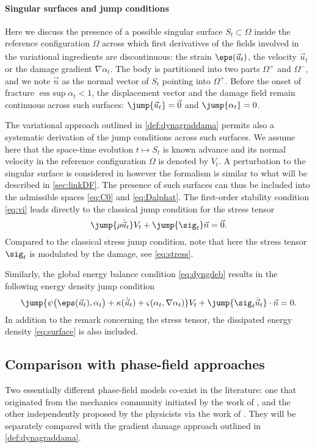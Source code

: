 \paragraph{Singular surfaces and jump conditions}
Here we discuss the presence of a possible singular surface $S_t\subset\Omega$ inside the reference configuration $\Omega$ across which first derivatives of the fields involved in the variational ingredients are discontinuous: the strain $\eps(\vec{u}_t)$, the velocity $\dot{\vec{u}}_t$ or the damage gradient $\nabla\alpha_t$. The body is partitioned into two parts $\Omega^+$ and $\Omega^-$, and we note $\vec{n}$ as the normal vector of $S_t$ pointing into $\Omega^+$. Before the onset of fracture $\operatorname{ess\ sup}\alpha_t< 1$, the displacement vector and the damage field remain continuous across such surfaces: $\jump{\vec{u}_t}=\vec{0}$ and $\jump{\alpha_t}=0$.

The variational approach outlined in \cref{def:dynagraddama} permits also a systematic derivation of the jump conditions across such surfaces. We assume here that the space-time evolution $t\mapsto S_t$ is known advance and its normal velocity in the reference configuration $\Omega$ is denoted by $V_t$. A perturbation to the singular surface is considered in \cite{BatraBedfordDrumheller:1986} however the formalism is similar to what will be described in \cref{sec:linkDF}. The presence of such surfaces can thus be included into the admissible spaces \eqref{eq:C0} and \eqref{eq:Dalphat}. The first-order stability condition \eqref{eq:vi} leads directly to the classical jump condition for the stress tensor
\begin{equation}
\jump{\rho\dot{\vec{u}}_t}V_t+\jump{\sig_t}\vec{n}=\vec{0}.
\end{equation}
Compared to the classical stress jump condition, note that here the stress tensor $\sig_t$ is modulated by the damage, see \eqref{eq:stress}.

Similarly, the global energy balance condition \eqref{eq:dyngdeb} results in the following energy density jump condition
\begin{equation}
\jump{\psi\bigl(\eps(\vec{u}_t),\alpha_t\bigr)+\kappa(\dot{\vec{u}}_t)+\varsigma(\alpha_t,\nabla\alpha_t)}V_t+\jump{\sig_t\dot{\vec{u}}_t}\cdot\vec{n}=0.
\end{equation}
In addition to the remark concerning the stress tensor, the dissipated energy density \eqref{eq:surface} is also included.

\subsection{Comparison with phase-field approaches} \label{sec:phasefields}
Two essentially different phase-field models co-exist in the literature: one that originated from the mechanics community initiated by the work of \cite{MieheHofackerWelschinger:2010,MieheWelschingerHofacker:2010}, and the other independently proposed by the physicists via the work of \cite{KarmaKesslerLevine:2001,HakimKarma:2009}. They will be separately compared with the gradient damage approach outlined in \cref{def:dynagraddama}.

